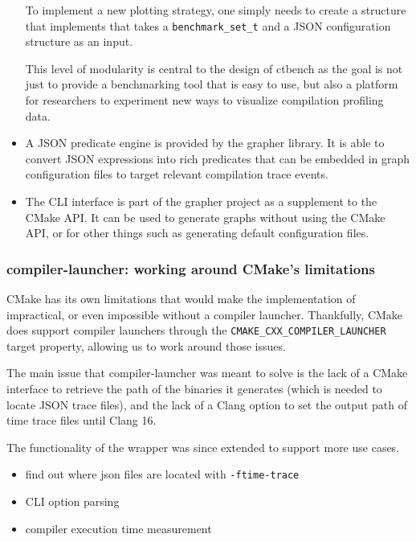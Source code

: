 \documentclass[../main]{subfiles}
\begin{document}
\begin{itemize}
  To implement a new plotting strategy, one simply needs to create a structure
  that implements that takes a \lstinline{benchmark_set_t} and a
  JSON configuration structure as an input.

  This level of modularity is central to the design of ctbench
  as the goal is not just to provide a benchmarking tool that is easy to use,
  but also a platform for researchers to experiment new ways to visualize
  compilation profiling data.

\item

  A JSON predicate engine is provided by the grapher library.
  It is able to convert JSON expressions into rich predicates
  that can be embedded in graph configuration files to target
  relevant compilation trace events.

\item

  The CLI interface is part of the grapher project as a supplement
  to the CMake API. It can be used to generate graphs without using
  the CMake API, or for other things such as generating default
  configuration files.

\end{itemize}

\subsubsection{
  compiler-launcher: working around CMake's limitations
}

CMake has its own limitations that would make the implementation of \ctbench
impractical, or even impossible without a compiler launcher. Thankfully, CMake
does support compiler launchers through the
\lstinline{CMAKE_CXX_COMPILER_LAUNCHER} target property,
allowing us to work around those issues.

The main issue that compiler-launcher was meant to solve is the lack of
a CMake interface to retrieve the path of the binaries it generates (which is
needed to locate JSON trace files), and the lack of a Clang option to set
the output path of time trace files until Clang 16.

The functionality of the wrapper was since extended to support more use cases.

\begin{itemize}
\item find out where json files are located with \lstinline{-ftime-trace}
\item CLI option parsing
\item compiler execution time measurement
\end{itemize}
\end{document}
